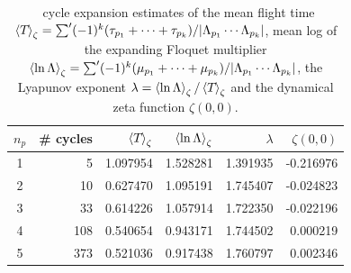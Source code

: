 \begin{table}[htbp]
  \centering
  \caption{\Dzeta\ cycle expansion estimates of
  the mean flight time
  $\left\langle {{\ensuremath{T_{}}}} \right\rangle_\zeta
  =\sum^{\prime}(-1)^{k}(\tau_{p_1}+\cdots+\tau_{p_k})/\vert\Lambda_{p_1}\cdots\Lambda_{p_k}\vert$,
  mean log of the expanding Floquet multiplier
  $\left\langle {\ln\ensuremath{\Lambda}} \right\rangle_\zeta
  =\sum^{\prime}(-1)^{k}(\mu_{p_1}+\cdots+\mu_{p_k})/\vert\Lambda_{p_1}\cdots\Lambda_{p_k}\vert$,
  the Lyapunov exponent $\lambda = \left\langle {\ln\ensuremath{\Lambda}} \right\rangle_\zeta / \left\langle {{\ensuremath{T_{}}}} \right\rangle_\zeta$ and the dynamical zeta function $\zeta(0,0)$.}
    \begin{tabular}{c|r|r|r|r|r}
    $n_p$ & \# cycles & $\left\langle {{\ensuremath{T_{}}}} \right\rangle_\zeta$
               & $\left\langle {\ln\ensuremath{\Lambda}} \right\rangle_\zeta$
                        & $\lambda$
                                 & $\zeta(0,0)$ \\
    \hline
    1 & 5 & 1.097954 & 1.528281 & 1.391935 & -0.216976 \\
    2 & 10 & 0.627470 & 1.095191 & 1.745407 & -0.024823 \\
    3 & 33  & 0.614226 & 1.057914 & 1.722350 & -0.022196 \\
    4 & 108 & 0.540654 & 0.943171 & 1.744502 &  0.000219 \\
    5 & 373 & 0.521036 & 0.917438 & 1.760797 &  0.002346 \\
    \end{tabular}%
  \label{tab:fddomaincycleaverage}%
\end{table}
